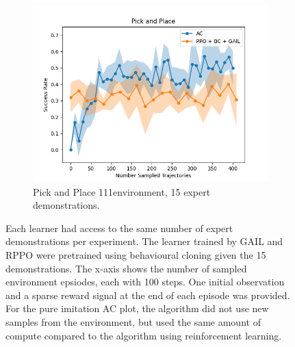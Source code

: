 \begin{figure}[htbp]
\begin{subfigure}[t]{0.3\textwidth}
      \includegraphics[width=\textwidth]{images/15_400/Pick and Place.png}
      \caption{Pick and Place 111environment, 15 expert demonstrations.}
      \label{fig:plot4}
    \end{subfigure}
    \caption{Each learner had access to the same number of expert demonstrations per experiment. 
    The learner trained by GAIL and RPPO were pretrained using behavioural cloning given the 15 demonstrations. 
    The x-axis shows the number of sampled environment epsiodes, each with 100 steps.  One initial observation and a sparse reward signal at the end of each episode was provided.
    For the pure imitation AC plot, the algorithm did not use new samples 
    from the environment, but used the same amount of compute compared to the algorithm using reinforcement learning.}
    \label{fig:15}
\end{figure}

